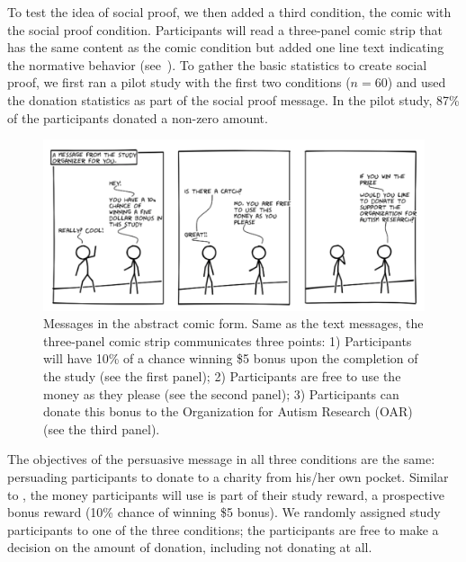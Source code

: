 To test the idea of social proof, we then added a third condition, the comic with the social proof condition. Participants will read a three-panel comic strip that has the same content as the comic condition but added one line text indicating the normative behavior (see~). To gather the basic statistics to create social proof, we first ran a pilot study with the first two conditions ($n=60$) and used the donation statistics as part of the social proof message. In the pilot study, 87\% of the participants donated a non-zero amount. 

\begin{figure}[bt]
    \centering
    \includegraphics[width=\columnwidth]{./figures/abstract_comic.png}
    \caption{Messages in the abstract comic form. Same as the text messages, the three-panel comic strip communicates three points: 1) Participants will have 10\% of a chance winning \$5 bonus upon the completion of the study (see the first panel); 2) Participants are free to use the money as they please (see the second panel); 3) Participants can donate this bonus to the Organization for Autism Research (OAR) (see the third panel).}
    \label{fig:basic three comic panel}
\end{figure}

The objectives of the persuasive message in all three conditions are the same: persuading participants to donate to a charity from his/her own pocket. Similar to \textcite{lee2013does}, the money participants will use is part of their study reward, a prospective bonus reward (10\% chance of winning \$5 bonus). We randomly assigned study participants to one of the three conditions; the participants are free to make a decision on the amount of donation, including not donating at all.



